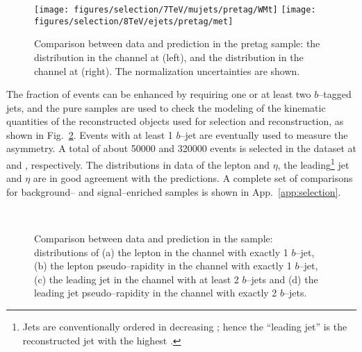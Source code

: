 \begin{figure}\centering
  \texttt{[image: figures/selection/7TeV/mujets/pretag/WMt]}
  \texttt{[image: figures/selection/8TeV/ejets/pretag/met]}
  \caption{
    Comparison between data and prediction in the pretag sample: the
    \mtw{} distribution in the \mujets{} channel at \seventev{}
    (left), and the \met{} distribution in the \ejets{} channel at
    \eighttev{} (right). The normalization uncertainties are shown.}
  \label{fig:pretagdatamc}
\end{figure}

The fraction of \ttbar{} events can be enhanced by requiring one or
at least two $b$--tagged jets, and the pure samples are used to check the
modeling of the kinematic quantities of the reconstructed
objects used for selection and reconstruction, as shown in
Fig.~\ref{fig:taggeddatamc}. Events with at least 1 $b$--jet are
eventually used to measure the asymmetry. A total of about 50000 and
320000 \ttbar{} events is selected in the dataset at \seventev{} and
\eighttev{}, respectively.
The distributions in data of the lepton \pt{} and $\eta$, the
leading\footnote{Jets are conventionally ordered in decreasing \pt{};
  hence the ``leading jet'' is the reconstructed jet with the highest
  \pt{}.} jet \pt{} and $\eta$ are in good agreement with the
predictions. A complete set of comparisons for background-- and
signal--enriched samples is shown in App.~\ref{app:selection}.

\begin{figure}\centering
  \quad
  \\
  \quad
  \caption{
    Comparison between data and prediction in the \eighttev{} sample:
    distributions of (a) the lepton \pt{} in the \mujets{} channel with
    exactly 1 $b$--jet, (b) the lepton pseudo--rapidity in the \ejets{}
    channel with exactly 1 $b$--jet, (c) the leading jet \pt{} in the
    \mujets{} channel with at least 2 $b$--jets and (d) the leading
    jet pseudo--rapidity in the \ejets{} channel with exactly 2
    $b$--jets.
}
  \label{fig:taggeddatamc}
\end{figure}

